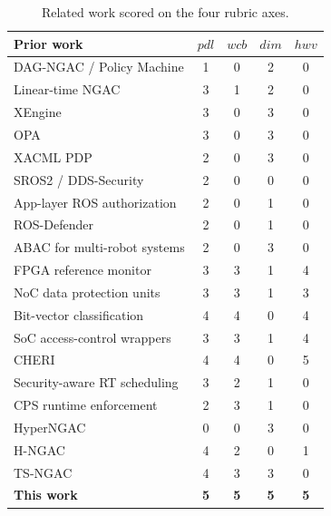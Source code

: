 \documentclass[conference]{IEEEtran}
\begin{document}
\begin{table}[t]
\caption{Related work scored on the four rubric axes.}
\label{tab:rubric}
\centering
\footnotesize
\setlength{\tabcolsep}{3.5pt}
\begin{tabular}{lcccc}
\toprule
Prior work & $\mathit{pdl}$ & $\mathit{wcb}$ & $\mathit{dim}$ & $\mathit{hwv}$ \\
\midrule
DAG-NGAC / Policy Machine \cite{incits565, ferraiolo2011policymachine} & 1 & 0 & 2 & 0 \\
Linear-time NGAC \cite{mell2017linear} & 3 & 1 & 2 & 0 \\
XEngine \cite{liu2011xengine} & 3 & 0 & 3 & 0 \\
OPA \cite{opa} & 3 & 0 & 3 & 0 \\
XACML PDP \cite{oasisxacml} & 2 & 0 & 3 & 0 \\
SROS2 / DDS-Security \cite{mayoralvilches2022sros2, omgddssec} & 2 & 0 & 0 & 0 \\
App-layer ROS authorization \cite{dieber2017security} & 2 & 0 & 1 & 0 \\
ROS-Defender \cite{rivera2019rosdefender} & 2 & 0 & 1 & 0 \\
ABAC for multi-robot systems \cite{salimi2025abac} & 2 & 0 & 3 & 0 \\
FPGA reference monitor \cite{huffmire2006policy} & 3 & 3 & 1 & 4 \\
NoC data protection units \cite{fiorin2008secure} & 3 & 3 & 1 & 3 \\
Bit-vector classification \cite{song2005bvtcam, ganegedara2014scalable} & 4 & 4 & 0 & 4 \\
SoC access-control wrappers \cite{restuccia2021aker} & 3 & 3 & 1 & 4 \\
CHERI \cite{watson2015cheri} & 4 & 4 & 0 & 5 \\
Security-aware RT scheduling \cite{hasan2017contego, lesi2017security, hasan2024sok} & 3 & 2 & 1 & 0 \\
CPS runtime enforcement \cite{pinisetty2017runtime} & 2 & 3 & 1 & 0 \\
HyperNGAC \cite{sitharaman2025hypergraph} & 0 & 0 & 3 & 0 \\
H-NGAC \cite{karim2026dcas} & 4 & 2 & 0 & 1 \\
TS-NGAC \cite{karim2026tsngac} & 4 & 3 & 3 & 0 \\
\textbf{This work} & \textbf{5} & \textbf{5} & \textbf{5} & \textbf{5} \\
\bottomrule
\end{tabular}
\end{table}
\end{document}
